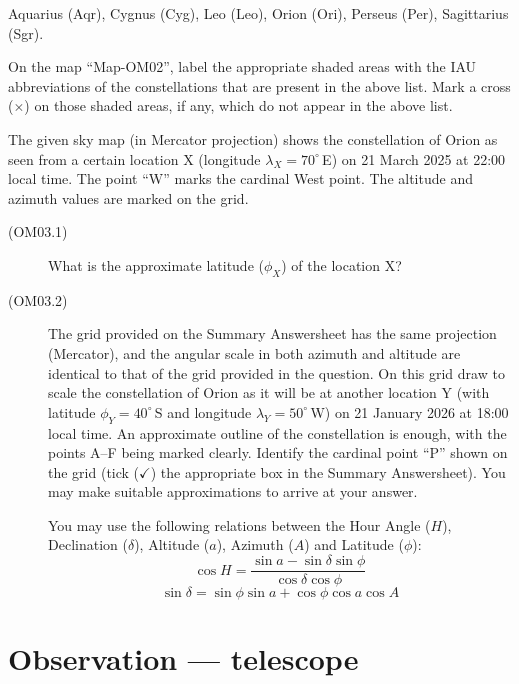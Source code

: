 \begin{description}
  Aquarius (Aqr), Cygnus (Cyg), Leo (Leo), Orion (Ori), Perseus (Per),
  Sagittarius (Sgr).

  On the map ``Map-OM02'', label the appropriate shaded areas with the IAU
  abbreviations of the constellations that are present in the above list.
  Mark a cross ($\times$) on those shaded areas, if any, which do not appear
  in the above list.
\end{description}

The given sky map (in Mercator projection) shows the constellation of Orion as
seen from a certain location X (longitude $\lambda_X = 70^\circ$\,E) on
21 March 2025 at 22:00 local time. The point ``W'' marks the cardinal West
point. The altitude and azimuth values are marked on the grid.


\begin{description}
\item[(OM03.1)] What is the approximate latitude ($\phi_X$) of the
  location X?
\item[(OM03.2)] The grid provided on the Summary Answersheet has the same
  projection (Mercator), and the angular scale in both azimuth and altitude
  are identical to that of the grid provided in the question. On this grid
  draw to scale the constellation of Orion as it will be at another location Y
  (with latitude $\phi_Y = 40^\circ$\,S and longitude
  $\lambda_Y = 50^\circ$\,W) on 21 January 2026 at 18:00 local time. An
  approximate outline of the constellation is enough, with the points A--F
  being marked clearly. Identify the cardinal point ``P'' shown on the grid
  (tick ($\checkmark$) the appropriate box in the Summary Answersheet). You
  may make suitable approximations to arrive at your answer.

  You may use the following relations between the Hour Angle ($H$),
  Declination ($\delta$), Altitude ($a$), Azimuth ($A$) and Latitude
  ($\phi$):
  \[ \cos H = \frac{\sin a - \sin\delta \sin\phi}{\cos\delta \cos\phi} \]
  \[ \sin\delta = \sin\phi \sin a + \cos\phi \cos a \cos A \]
\end{description}

\section*{Observation --- telescope}

